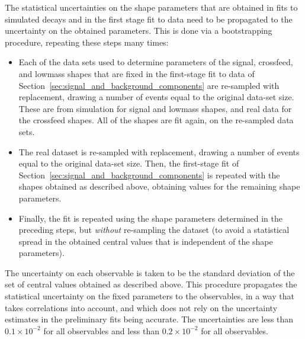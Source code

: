 The statistical uncertainties on the shape parameters that are obtained in fits to simulated decays and in the first stage fit to data need to be propagated to the uncertainty on the obtained parameters. This is done via a bootstrapping procedure, repeating these steps many times:
\begin{itemize}
    \item Each of the data sets used to determine parameters of the signal, crossfeed, and lowmass shapes that are fixed in the first-stage fit to data of Section~\ref{sec:signal_and_background_components} are re-sampled with replacement, drawing a number of events equal to the original data-set size. These are from simulation for signal and lowmass shapes, and real data for the crossfeed shapes. All of the shapes are fit again, on the re-sampled data sets.
    \item The real dataset is re-sampled with replacement, drawing a number of events equal to the original data-set size. Then, the first-stage fit of Section~\ref{sec:signal_and_background_components} is repeated with the shapes obtained as described above, obtaining values for the remaining shape parameters.
    \item Finally, the \CP fit is repeated using the shape parameters determined in the preceding steps, but \emph{without} re-sampling the dataset (to avoid a statistical spread in the obtained central values that is independent of the shape parameters).
\end{itemize}
The uncertainty on each observable is taken to be the standard deviation of the set of central values obtained as described above. This procedure propagates the statistical uncertainty on the fixed parameters to the observables, in a way that takes correlations into account, and which does not rely on the uncertainty estimates in the preliminary fits being accurate. The uncertainties are less than $0.1\times 10^{-2}$ for all \DK observables and less than $0.2\times 10^{-2}$ for all \Dpi observables.



